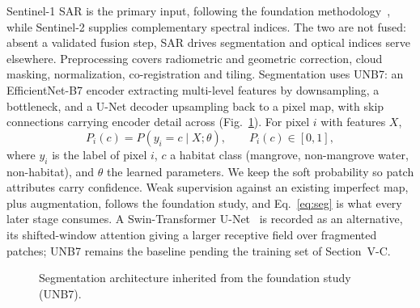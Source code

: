 \documentclass[conference]{IEEEtran}
\begin{document}
Sentinel-1 SAR is the primary input, following the foundation methodology~\cite{ghorbanian2025mangrove}, while Sentinel-2 supplies complementary spectral indices. The two are not fused: absent a validated fusion step, SAR drives segmentation and optical indices serve elsewhere. Preprocessing covers radiometric and geometric correction, cloud masking, normalization, co-registration and tiling. Segmentation uses UNB7: an EfficientNet-B7 encoder extracting multi-level features by downsampling, a bottleneck, and a U-Net decoder upsampling back to a pixel map, with skip connections carrying encoder detail across (Fig.~\ref{fig:segmentation}). For pixel $i$ with features $X$,
\begin{equation}
P_i(c) = P(y_i = c \mid X; \theta), \qquad P_i(c) \in [0,1],
\label{eq:seg}
\end{equation}
where $y_i$ is the label of pixel $i$, $c$ a habitat class (mangrove, non-mangrove water, non-habitat), and $\theta$ the learned parameters. We keep the soft probability so patch attributes carry confidence. Weak supervision against an existing imperfect map, plus augmentation, follows the foundation study, and Eq.~\eqref{eq:seg} is what every later stage consumes. A Swin-Transformer U-Net~\cite{liu2021swin} is recorded as an alternative, its shifted-window attention giving a larger receptive field over fragmented patches; UNB7 remains the baseline pending the training set of Section~V-C.

\begin{figure}[!tbp]
\centering
{}
\caption{Segmentation architecture inherited from the foundation study (UNB7).}
\label{fig:segmentation}
\end{figure}
\end{document}
